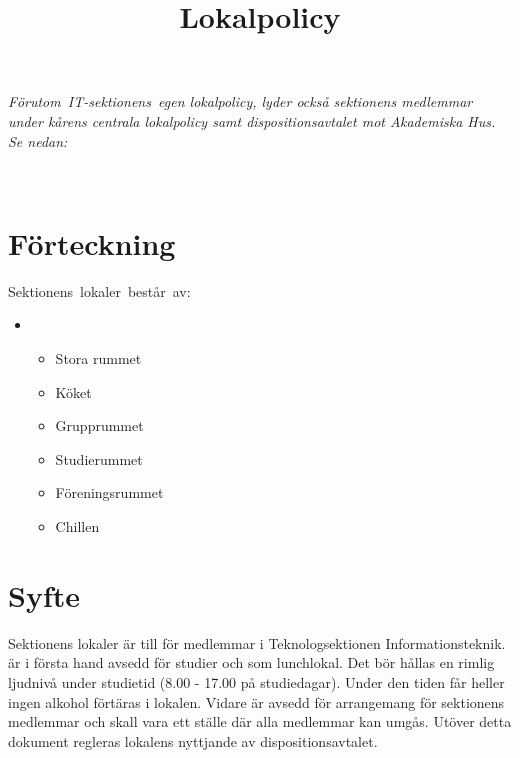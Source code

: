 \documentclass[11pt, includeaddress]{../../classes/cthit}
\begin{document}
\title{Lokalpolicy}
\maketitle

\thispagestyle{empty}

\newpage

\makeheadfoot%

\setcounter{tocdepth}{2}
\setcounter{page}{1}
\tableofcontents

\newpage

\emph{Förutom IT­-sektionens egen lokalpolicy, lyder också sektionens medlemmar under kårens centrala lokalpolicy samt dispositionsavtalet mot Akademiska Hus. Se nedan:}

\\


\section{Förteckning}
Sektionens lokaler består av:
\begin{itemize}  
  \item \HUBBEN 
  	\begin{itemize}  
	  \item Stora rummet
	  \item Köket
	  \item Grupprummet
	  \item Studierummet
	  \item Föreningsrummet
	  \item Chillen
	\end{itemize}
\end{itemize}


\section{Syfte}
Sektionens lokaler är till för medlemmar i Teknologsektionen Informationsteknik.
\HUBBEN är i första hand avsedd för studier och som lunchlokal. Det bör hållas en rimlig ljudnivå under studietid (8.00 - 17.00 på studiedagar). Under den tiden får heller ingen alkohol förtäras i lokalen. Vidare är \HUBBEN avsedd för arrangemang för sektionens medlemmar och skall vara ett ställe där alla medlemmar kan umgås. Utöver detta dokument regleras lokalens nyttjande av dispositionsavtalet.
\end{document}
